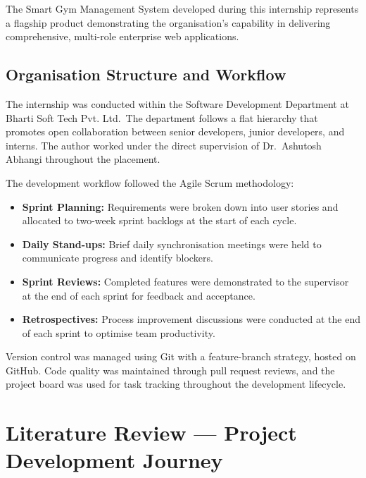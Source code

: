 \documentclass[
  12pt,
  a4paperpaper,
]{report}
\providecommand{\tightlist}{%
  \setlength{\itemsep}{0pt}\setlength{\parskip}{0pt}}
\begin{document}
\medskip

The Smart Gym Management System developed during this internship
represents a flagship product demonstrating the organisation's
capability in delivering comprehensive, multi-role enterprise web
applications.


\section{Organisation Structure and
Workflow}\label{organisation-structure-and-workflow}

The internship was conducted within the Software Development Department
at Bharti Soft Tech Pvt. Ltd.~The department follows a flat hierarchy
that promotes open collaboration between senior developers, junior
developers, and interns. The author worked under the direct supervision
of Dr.~Ashutosh Abhangi throughout the placement.

The development workflow followed the Agile Scrum methodology:

\begin{itemize}
\tightlist
\item
  \textbf{Sprint Planning:} Requirements were broken down into user
  stories and allocated to two-week sprint backlogs at the start of each
  cycle.
\item
  \textbf{Daily Stand-ups:} Brief daily synchronisation meetings were
  held to communicate progress and identify blockers.
\item
  \textbf{Sprint Reviews:} Completed features were demonstrated to the
  supervisor at the end of each sprint for feedback and acceptance.
\item
  \textbf{Retrospectives:} Process improvement discussions were
  conducted at the end of each sprint to optimise team productivity.
\end{itemize}

Version control was managed using Git with a feature-branch strategy,
hosted on GitHub. Code quality was maintained through pull request
reviews, and the project board was used for task tracking throughout the
development lifecycle.

\clearpage

\chapter{Literature Review --- Project Development
Journey}\label{literature-review---project-development-journey}
\end{document}
